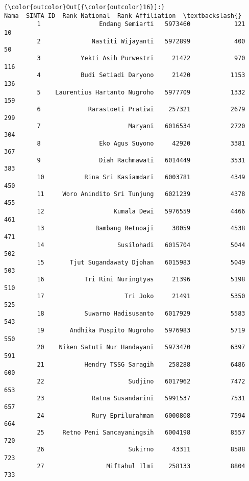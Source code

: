 \documentclass[11pt]{article}
\begin{document}
            \begin{Verbatim}[commandchars=\\\{\}]
{\color{outcolor}Out[{\color{outcolor}16}]:}                             Nama  SINTA ID  Rank National  Rank Affiliation  \textbackslash{}
         1                Endang Semiarti   5973460            121                10   
         2              Nastiti Wijayanti   5972899            400                50   
         3           Yekti Asih Purwestri     21472            970               116   
         4           Budi Setiadi Daryono     21420           1153               136   
         5    Laurentius Hartanto Nugroho   5977709           1332               159   
         6             Rarastoeti Pratiwi    257321           2679               299   
         7                        Maryani   6016534           2720               304   
         8                Eko Agus Suyono     42920           3381               367   
         9                Diah Rachmawati   6014449           3531               383   
         10           Rina Sri Kasiamdari   6003781           4349               450   
         11     Woro Anindito Sri Tunjung   6021239           4378               455   
         12                   Kumala Dewi   5976559           4466               461   
         13              Bambang Retnoaji     30059           4538               471   
         14                    Susilohadi   6015704           5044               502   
         15       Tjut Sugandawaty Djohan   6015983           5049               503   
         16           Tri Rini Nuringtyas     21396           5198               510   
         17                      Tri Joko     21491           5350               525   
         18           Suwarno Hadisusanto   6017929           5583               543   
         19       Andhika Puspito Nugroho   5976983           5719               550   
         20    Niken Satuti Nur Handayani   5973470           6397               591   
         21           Hendry TSSG Saragih    258288           6486               600   
         22                       Sudjino   6017962           7472               653   
         23             Ratna Susandarini   5991537           7531               657   
         24             Rury Eprilurahman   6000808           7594               664   
         25     Retno Peni Sancayaningsih   6004198           8557               720   
         26                       Sukirno     43311           8588               723   
         27                 Miftahul Ilmi    258133           8804               733   

\end{Verbatim}
\end{document}

